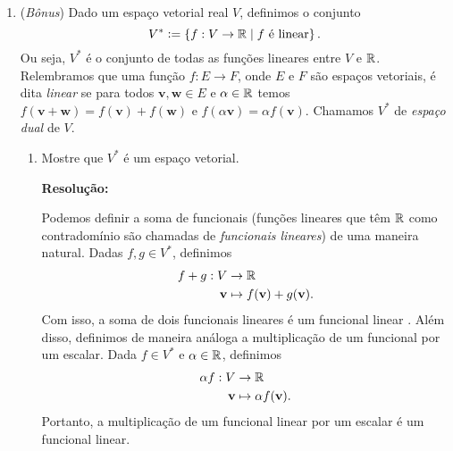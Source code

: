 \documentclass[leqno]{article}
\numberwithin{equation}{section}
\newcommand{\bfw}{\mathbf{w}}
\newcommand{\bfv}{\mathbf{v}}
\newenvironment{sol}
{
    \vspace{4mm}
    \noindent\textbf{Resolução:}
    \strut\newline
    \smallskip
    \hspace{-3.5mm}
}
{}
\begin{document}
\begin{enumerate}
        \begin{sol} 
            Pela questão anterior, temos
            \begin{equation*}
                n = \posto ( I ) = \posto ( AB ) \leq \posto ( A )
            .\end{equation*}
            Como \( A \) é \( n \times n \), também temos \( \posto ( A ) \leq n \) e, com isso, \( \posto ( A ) = n \).
            Sendo assim, \( A \) é uma matriz invertível.
            Logo,
            \begin{equation*}
                B = IB = A^{ -1 } A B = A^{ -1 } I = A^{ -1 }
            .\end{equation*}
        \end{sol} 

    \item (\textit{Bônus}) Dado um espaço vetorial real \( V \), definimos o conjunto
        \begin{equation*}
            V^{ * } \vcentcolon= \left\{ f : V \to \mathbb{R} \mid f \text{ é linear} \right\}
        .\end{equation*}
        Ou seja, \( V^{ * } \) é o conjunto de todas as funções lineares entre \( V \) e \( \mathbb{R} \).
        Relembramos que uma função \( f : E \to F \), onde \( E \) e \( F \) são espaços vetoriais, é dita \textit{linear} se para todos \( \bfv, \bfw \in E \) e \( \alpha \in \mathbb{R} \) temos \( f ( \bfv + \bfw ) = f ( \bfv ) + f ( \bfw ) \) e \( f ( \alpha \bfv ) = \alpha f ( \bfv ) \).
        Chamamos \( V^{ * } \) de \textit{espaço dual} de \( V \).
        \begin{enumerate}
            \item Mostre que \( V^{ * } \) é um espaço vetorial.

                \begin{sol} 
                    Podemos definir a soma de funcionais (funções lineares que têm \( \mathbb{R} \) como contradomínio são chamadas de \textit{funcionais lineares}) de uma maneira natural.
                    Dadas \( f, g \in V^{ * } \), definimos
                    \begin{align*}
                        f + g : V &\to \R \\
                        \bfv &\mapsto f ( \bfv ) + g ( \bfv )
                    .\end{align*}
                \end{sol} 
                Com isso, a soma de dois funcionais lineares é um funcional linear .
                Além disso, definimos de maneira análoga a multiplicação de um funcional por um escalar.
                Dada \( f \in V^{ * } \) e \( \alpha \in \mathbb{R} \), definimos
                \begin{align*}
                    \alpha f : V &\to \R \\
                    \bfv &\mapsto \alpha f ( \bfv )
                .\end{align*}
                Portanto, a multiplicação de um funcional linear por um escalar é um funcional linear.


\end{enumerate}
\end{enumerate}
\end{document}

